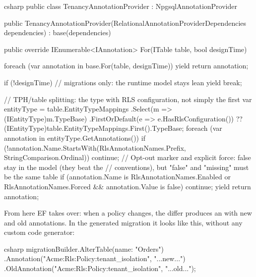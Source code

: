 \begin{sourcecode}{csharp}
public class TenancyAnnotationProvider : NpgsqlAnnotationProvider
{
    public TenancyAnnotationProvider(RelationalAnnotationProviderDependencies dependencies)
        : base(dependencies)
    {
    }

    public override IEnumerable<IAnnotation> For(ITable table, bool designTime)
    {
        foreach (var annotation in base.For(table, designTime))
            yield return annotation;

        if (!designTime)          // migrations only: the runtime model stays lean
            yield break;

        // TPH/table splitting: the type with RLS configuration, not simply the first
        var entityType = table.EntityTypeMappings
            .Select(m => (IEntityType)m.TypeBase)
            .FirstOrDefault(e => e.HasRlsConfiguration())
            ?? (IEntityType)table.EntityTypeMappings.First().TypeBase;
        foreach (var annotation in entityType.GetAnnotations())
        {
            if (!annotation.Name.StartsWith(RlsAnnotationNames.Prefix,
                                            StringComparison.Ordinal))
                continue;
            // Opt-out marker and explicit force: false stay in the model (they beat the
            // conventions), but "false" and "missing" must be the same table
            if (annotation.Name is RlsAnnotationNames.Enabled or RlsAnnotationNames.Forced
                && annotation.Value is false)
                continue;
            yield return annotation;
        }
    }
}
\end{sourcecode}

From here EF takes over: when a policy changes, the differ produces an
 with new and old annotations. In the
generated migration it looks like this, without any custom code generator:

\begin{sourcecode}{csharp}
migrationBuilder.AlterTable(name: "Orders")
    .Annotation("Acme:Rls:Policy:tenant_isolation", "{...new...}")
    .OldAnnotation("Acme:Rls:Policy:tenant_isolation", "{...old...}");
\end{sourcecode}

